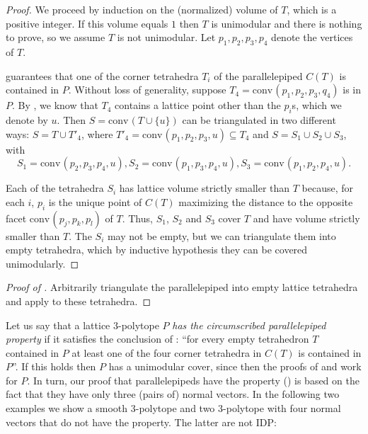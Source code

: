 \documentclass{amsart}
\theoremstyle{plain}
\theoremstyle{definition}
\newcommand{\conv}{\ensuremath{\mathrm{conv}}\hspace{1pt}}
\begin{document}
\begin{proof}
We proceed by induction on the (normalized) volume of $T$, which is a positive integer. If this volume equals $1$ then $T$ is unimodular and there is nothing to prove, so we assume $T$ is not unimodular. Let $p_1, p_2, p_3, p_4$ denote the vertices of $T$.

 guarantees that one of the corner tetrahedra $T_i$ of the parallelepiped $C(T)$ is contained in $P$. Without loss of generality, suppose $T_4 = \conv(p_1, p_2, p_3,q_4)$ is in $P$. By , we know that $T_4$ contains a lattice point other than the $p_i$s, which we denote by $u$. 
%
Then $S=\conv(T\cup \{u\})$ can be triangulated in two different ways: $S=T \cup T'_4$, where $T'_4 = \conv(p_1, p_2, p_3, u) \subseteq T_4$ and $S= S_1 \cup S_2 \cup S_3$, with
\[
S_1= \conv(p_2,p_3,p_4, u),
S_2=\conv(p_1,p_3,p_4, u),
S_3=\conv(p_1,p_2,p_4, u).
\]

Each of the tetrahedra $S_i$ has lattice volume strictly smaller than $T$ because, for each $i$, $p_i$ is the unique point of $C(T)$ maximizing the distance to the opposite facet $\conv(p_j,p_k,p_l)$ of $T$. Thus, $S_1$, $S_2$ and $S_3$ cover $T$ and have volume strictly smaller than $T$. The $S_i$ may not be empty, but we can triangulate them into empty tetrahedra, which by inductive hypothesis they can be covered unimodularly.
\end{proof}

\begin{proof}[Proof of ]
Arbitrarily triangulate the parallelepiped into empty lattice tetrahedra and apply  to these tetrahedra.
\end{proof}


Let us say that a lattice $3$-polytope $P$ \emph{has the circumscribed parallelepiped property} if it satisfies the conclusion of :  ``for every empty tetrahedron $T$ contained in $P$ at least one of the four corner tetrahedra in $C(T)$ is 
contained in $P$''. 
If this holds then $P$ has a unimodular cover, since then the proofs of  and  work for $P$.
In turn, our proof that parallelepipeds have the property () is based on the fact that they have only three (pairs of) normal vectors. 
In the following two examples we show a smooth $3$-polytope and two $3$-polytope with four normal vectors that do not have the property. The latter are not IDP:
\end{document}
